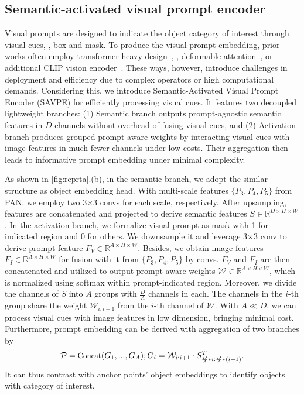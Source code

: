 \documentclass[10pt,twocolumn,letterpaper]{article}
\begin{document}
\subsection{Semantic-activated visual prompt encoder}
\label{sec:savpe}
Visual prompts are designed to indicate the object category of interest through visual cues, \eg, box and mask. To produce the visual prompt embedding, prior works often employ transformer-heavy design~\cite{jiang2024trex2,li2024dinov}, \eg, deformable attention~\cite{zhu2021deformabledetr}, or additional CLIP vision encoder~\cite{radford2021clip,zang2022ovdetr}. These ways, however, introduce challenges in deployment and efficiency due to complex operators or high computational demands. Considering this, we introduce Semantic-Activated Visual Prompt Encoder (SAVPE) for efficiently processing visual cues. It features two decoupled lightweight branches: (1) Semantic branch outputs prompt-agnostic semantic features in $D$ channels without overhead of fusing visual cues, and (2) Activation branch produces grouped prompt-aware weights by interacting visual cues with image features in much fewer channels under low costs. Their aggregation then leads to informative prompt embedding under minimal complexity.

As shown in \cref{fig:reprta}.(b), in the semantic branch, we adopt the similar structure as object embedding head. With multi-scale features $\{P_3, P_4, P_5\}$ from PAN, we employ two 3$\times$3 convs for each scale, respectively. After upsampling, features are concatenated and projected to derive semantic features $S \in \mathbb{R}^{D \times H \times W}$. In the activation branch, we formalize visual prompt as mask with 1 for indicated region and 0 for others. We downsample it and leverage 3$\times$3 conv to derive prompt feature $F_{V} \in \mathbb{R}^{A \times H \times W}$. Besides, we obtain image features $F_{I} \in \mathbb{R}^{A \times H \times W}$ for fusion with it from $\{P_3, P_4, P_5\}$ by convs. $F_{V}$ and $F_{I}$ are then concatenated and utilized to output prompt-aware weights $\mathcal{W} \in \mathbb{R}^{A \times H \times W}$, which is normalized using softmax within prompt-indicated region. Moreover, we divide the channels of $S$ into $A$ groups with $\frac{D}{A}$ channels in each. The channels in the $i$-th group share the weight $\mathcal{W}_{i:i+1}$ from the $i$-th channel of $\mathcal{W}$. With $A\ll D$, we can process visual cues with image features in low dimension, bringing minimal cost. Furthermore, prompt embedding can be derived with aggregation of two branches by
\begin{equation}
    \small
    \setlength{\abovedisplayskip}{5pt}
    \setlength{\belowdisplayskip}{5pt}
    \mathcal{P} = \text{Concat}(G_1, ..., G_A); G_i = \mathcal{W}_{i:i+1} \cdot S^T_{\frac{D}{A} * i:\frac{D}{A} * (i+1)}.
\end{equation} It can thus contrast with anchor points' object embeddings to identify objects with category of interest.
\end{document}
